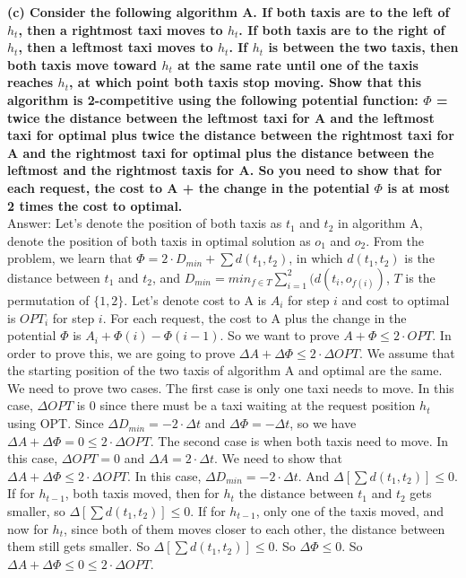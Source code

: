 \documentclass{article}
\begin{document}
\textbf{(c) Consider the following algorithm A. If both taxis are to the left of $h_t$, then a rightmost taxi moves to $h_t$. If both taxis are to the right of $h_t$, then a leftmost taxi moves to $h_t$. If $h_t$ is between the two taxis, then both taxis move toward $h_t$ at the same rate until one of the taxis reaches $h_t$, at which point both taxis stop moving. Show that this algorithm is 2-competitive using the following potential function: $\Phi$ = twice the distance between the leftmost taxi for A and the leftmost taxi for optimal plus twice the distance between the rightmost taxi for A and the rightmost taxi for optimal plus the distance between the leftmost and the rightmost taxis for A. So you need to show that for each request, the cost to A + the change in the potential $\Phi$ is at most 2 times the cost to optimal.
}\\ \newline
Answer: Let's denote the position of both taxis as $t_1$ and $t_2$ in algorithm A, denote the position of both taxis in optimal solution as $o_1$ and $o_2$. From the problem, we learn that $\Phi = 2\cdot D_{min} + \sum d(t_1, t_2)$, in which $d(t_1, t_2)$ is the distance between $t_1$ and $t_2$, and $D_{min} = min_{f\in T}\sum_{i=1}^2(d(t_i, o_{f(i)})$, $T$ is the permutation of $\{1,2\}$. Let's denote cost to A is $A_i$ for step $i$ and cost to optimal is $OPT_i$ for step $i$. For each request, the cost to A plus the change in the potential $\Phi$ is $A_i + \Phi(i) - \Phi(i-1)$. So we want to prove $A + \Phi \leq 2\cdot OPT$. In order to prove this, we are going to prove $\Delta A + \Delta \Phi \leq 2 \cdot \Delta OPT$. We assume that the starting position of the two taxis of algorithm A and optimal are the same. We need to prove two cases. The first case is only one taxi needs to move. In this case, $\Delta OPT$ is 0 since there must be a taxi waiting at the request position $h_t$ using OPT. Since $\Delta D_{min} = -2\cdot \Delta t$ and $\Delta \Phi = -\Delta t$, so we have $\Delta A + \Delta \Phi = 0 \leq 2\cdot \Delta OPT$. The second case is when both taxis need to move.  In this case, $\Delta OPT = 0$ and $\Delta A = 2\cdot \Delta t$. We need to show that $\Delta A + \Delta \Phi \leq 2 \cdot \Delta OPT$. In this case, $\Delta D_{min} = -2 \cdot \Delta t$. And $\Delta [\sum d(t_1, t_2)] \leq 0$. If for $h_{t-1}$, both taxis moved, then  for $h_t$ the distance between $t_1$ and $t_2$ gets smaller, so $\Delta [\sum d(t_1, t_2)] \leq 0$. If for $h_{t-1}$, only one of the taxis moved, and now for $h_t$, since both of them moves closer to each other, the distance between them still gets smaller. So $\Delta [\sum d(t_1, t_2)] \leq 0$. So $\Delta \Phi \leq 0$. So $\Delta A + \Delta \Phi \leq 0 \leq 2 \cdot \Delta OPT$.
\end{document}
